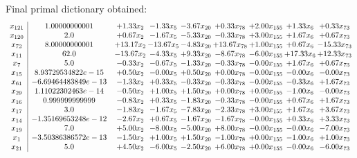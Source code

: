 \documentclass[8pt]{article}
\begin{document}
 Final primal dictionary obtained: 
\[\begin{array}{c| c c@{\hskip 2pt} c@{\hskip 2pt} c@{\hskip 2pt} c@{\hskip 2pt} c@{\hskip 2pt} c@{\hskip 2pt} c@{\hskip 2pt} }
 x_{121}   &  1.00000000001 & +  1.33 x_{2} & -1.33 x_{5} & -3.67 x_{20} & +  0.33 x_{78} & +  2.00 x_{155} & +  1.33 x_{6} & +  0.33 x_{73}\\
 x_{120}   &  2.0 & +  0.67 x_{2} & -1.67 x_{5} & -5.33 x_{20} & -0.33 x_{78} & +  3.00 x_{155} & +  1.67 x_{6} & +  0.67 x_{73}\\
 x_{72}   &  8.00000000001 & + 13.17 x_{2} & -13.67 x_{5} & -4.83 x_{20} & + 13.67 x_{78} & +  1.00 x_{155} & +  0.67 x_{6} & -15.33 x_{73}\\
 x_{11}   &  62.0 & -13.67 x_{2} & -4.33 x_{5} & +  9.33 x_{20} & -8.67 x_{78} & -6.00 x_{155} & + 17.33 x_{6} & + 12.33 x_{73}\\
 x_{7}   &  5.0 & -0.33 x_{2} & -0.67 x_{5} & -1.33 x_{20} & -0.33 x_{78} & -0.00 x_{155} & +  1.67 x_{6} & +  0.67 x_{73}\\
 x_{15}   &  8.93729534822e-15 & +  0.50 x_{2} & -0.00 x_{5} & +  0.50 x_{20} & +  0.00 x_{78} & -0.00 x_{155} & -0.00 x_{6} & -0.00 x_{73}\\
 x_{61}   &  -6.69464483849e-13 & -1.33 x_{2} & +  0.33 x_{5} & -0.33 x_{20} & -0.33 x_{78} & -0.00 x_{155} & -0.33 x_{6} & +  1.67 x_{73}\\
 x_{29}   &  1.11022302463e-14 & -0.50 x_{2} & +  1.00 x_{5} & +  1.50 x_{20} & +  0.00 x_{78} & +  0.00 x_{155} & -1.00 x_{6} & -0.00 x_{73}\\
 x_{16}   &  0.999999999999 & -0.83 x_{2} & +  0.33 x_{5} & -1.83 x_{20} & -0.33 x_{78} & -0.00 x_{155} & +  0.67 x_{6} & +  1.67 x_{73}\\
 x_{17}   &  3.0 & -1.83 x_{2} & -1.67 x_{5} & -7.83 x_{20} & -2.33 x_{78} & +  3.00 x_{155} & +  1.67 x_{6} & +  3.67 x_{73}\\
 x_{14}   &  -1.35169653248e-12 & -2.67 x_{2} & +  0.67 x_{5} & -1.67 x_{20} & -1.67 x_{78} & -0.00 x_{155} & +  0.33 x_{6} & +  3.33 x_{73}\\
 x_{19}   &  7.0 & +  5.00 x_{2} & -8.00 x_{5} & -5.00 x_{20} & +  8.00 x_{78} & -0.00 x_{155} & -0.00 x_{6} & -7.00 x_{73}\\
 x_{1}   &  -3.50386386572e-13 & -1.50 x_{2} & +  1.00 x_{5} & +  1.50 x_{20} & -1.00 x_{78} & +  0.00 x_{155} & -1.00 x_{6} & +  1.00 x_{73}\\
 x_{21}   &  5.0 & +  4.50 x_{2} & -6.00 x_{5} & -2.50 x_{20} & +  6.00 x_{78} & +  0.00 x_{155} & -0.00 x_{6} & -6.00 x_{73}\\

\end{array}\]
\end{document}
